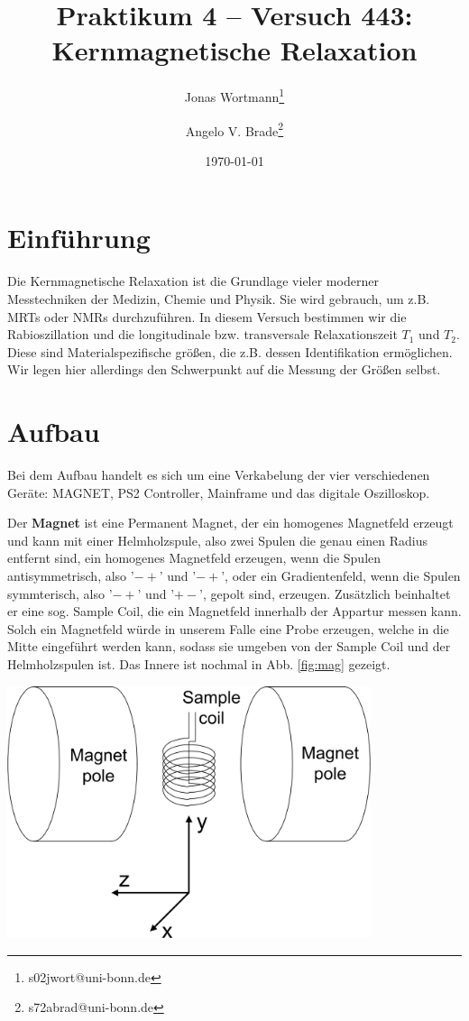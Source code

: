 \documentclass[10pt]{article}
\title{Praktikum 4 -- Versuch 443: Kernmagnetische Relaxation}
\author[1]{Jonas Wortmann\thanks{s02jwort@uni-bonn.de}}
\author[1]{Angelo V. Brade\thanks{s72abrad@uni-bonn.de}}
\affil[1]{Rheinische Friedrich-Wilhelms-Universität Bonn}
\date{\today}
\newenvironment{Figure}
  {\par\medskip\noindent\minipage{\linewidth}}
  {\endminipage\par\medskip}
\begin{document}
\maketitle



\pagestyle{fancy}
\fancyhead[R]{\thepage}
\fancyhead[L]{\leftmark}


\begin{multicols}{2}
  \section{Einführung}
  Die Kernmagnetische Relaxation ist die Grundlage vieler moderner Messtechniken der Medizin, Chemie und Physik. Sie wird gebrauch, um z.B. MRTs oder NMRs durchzuführen. In diesem Versuch bestimmen wir die Rabioszillation und die longitudinale bzw. transversale Relaxationszeit $T_1$ und $T_2$. Diese sind Materialspezifische größen, die z.B. dessen Identifikation ermöglichen. Wir legen hier allerdings den Schwerpunkt auf die Messung der Größen selbst.
  \section{Aufbau}
  Bei dem Aufbau handelt es sich um eine Verkabelung der vier verschiedenen Geräte: MAGNET, PS2 Controller, Mainframe und das digitale Oszilloskop.
  
  Der \textbf{Magnet} ist eine Permanent Magnet, der ein homogenes Magnetfeld erzeugt und kann mit einer Helmholzspule, also zwei Spulen die genau einen Radius entfernt sind, ein homogenes Magnetfeld erzeugen, wenn die Spulen antisymmetrisch, also '$-+$' und '$-+$', oder ein Gradientenfeld, wenn die Spulen symmterisch, also '$-+$' und '$+-$', gepolt sind, erzeugen. Zusätzlich beinhaltet er eine sog. Sample Coil, die ein Magnetfeld innerhalb der Appartur messen kann. Solch ein Magnetfeld würde in unserem Falle eine Probe erzeugen, welche in die Mitte eingeführt werden kann, sodass sie umgeben von der Sample Coil und der Helmholzspulen ist. Das Innere ist nochmal in Abb. \ref{fig:mag} gezeigt.
\begin{Figure}
		\centering\includegraphics[width=0.8\textwidth]{magnet_aufbau.png}
		\label{fig:mag}
	\end{Figure}


\end{multicols}
\end{document}
